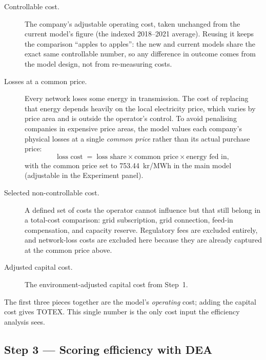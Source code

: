 \begin{description}
  \item[Controllable cost.] The company's adjustable operating cost, taken
        unchanged from the current model's figure (the indexed 2018--2021
        average). Reusing it keeps the comparison ``apples to apples'': the new
        and current models share the exact same controllable number, so any
        difference in outcome comes from the model design, not from re-measuring
        costs.

  \item[Losses at a common price.] Every network loses some energy in
        transmission. The cost of replacing that energy depends heavily on the
        local electricity price, which varies by price area and is outside the
        operator's control. To avoid penalising companies in expensive price
        areas, the model values each company's physical losses at a single
        \emph{common price} rather than its actual purchase price:
        \begin{equation}
          \text{loss cost} \;=\; \text{loss share} \times \text{common price}
          \times \text{energy fed in},
        \end{equation}
        with the common price set to \SI{753.44}{kr/MWh} in the main model
        (adjustable in the Experiment panel).

  \item[Selected non-controllable cost.] A defined set of costs the operator
        cannot influence but that still belong in a total-cost comparison: grid
        subscription, grid connection, feed-in compensation, and capacity
        reserve. Regulatory fees are excluded entirely, and network-loss costs
        are excluded here because they are already captured at the common price
        above.

  \item[Adjusted capital cost.] The environment-adjusted capital cost from
        Step~1.
\end{description}

The first three pieces together are the model's \emph{operating} cost; adding the
capital cost gives TOTEX. This single number is the only cost input the
efficiency analysis sees.


\subsection{Step 3 --- Scoring efficiency with DEA}
\label{sec:step3}

